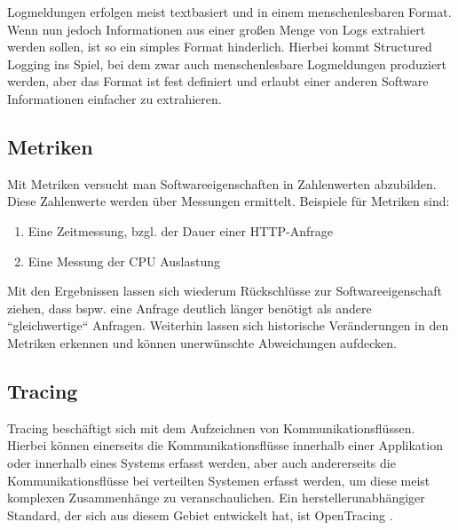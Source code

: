 %

Logmeldungen erfolgen meist textbasiert und in einem menschenlesbaren Format. Wenn nun jedoch Informationen aus einer großen Menge von Logs extrahiert werden sollen, ist so ein simples Format hinderlich. Hierbei kommt Structured Logging ins Spiel, bei dem zwar auch menschenlesbare Logmeldungen produziert werden, aber das Format ist fest definiert und erlaubt einer anderen Software Informationen einfacher zu extrahieren.

\subsection{Metriken}

Mit Metriken versucht man Softwareeigenschaften in Zahlenwerten abzubilden. Diese Zahlenwerte werden über Messungen ermittelt. Beispiele für Metriken sind:

\begin{enumerate}
	\item Eine Zeitmessung, bzgl. der Dauer einer HTTP-Anfrage
	\item Eine Messung der CPU Auslastung
\end{enumerate}

Mit den Ergebnissen lassen sich wiederum Rückschlüsse zur Softwareeigenschaft ziehen, dass bspw. eine Anfrage deutlich länger benötigt als andere ``gleichwertige`` Anfragen. Weiterhin lassen sich historische Veränderungen in den Metriken erkennen und können unerwünschte Abweichungen aufdecken.

\subsection{Tracing}
\label{sec:tracing}

Tracing beschäftigt sich mit dem Aufzeichnen von Kommunikationsflüssen. Hierbei können einerseits die Kommunikationsflüsse innerhalb einer Applikation oder innerhalb eines Systems erfasst werden, aber auch andererseits die Kommunikationsflüsse bei verteilten Systemen erfasst werden, um diese meist komplexen Zusammenhänge zu veranschaulichen. Ein herstellerunabhängiger Standard, der sich aus diesem Gebiet entwickelt hat, ist OpenTracing \cite{OpenTracing}.

